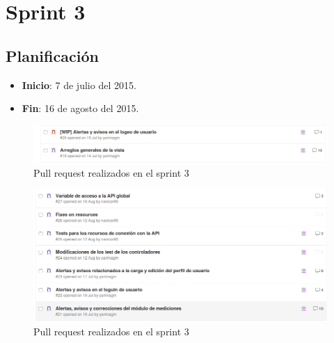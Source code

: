 \section{Sprint 3}%

\subsection{Planificación}
\begin{itemize}
    \item \textbf{Inicio}: 7 de julio del 2015.
    \item \textbf{Fin}: 16 de agosto del 2015.
\end{itemize}

\begin{figure}[h!]
  \centering
  \includegraphics[width=.8\textwidth]{img/3-PR_1_front}
  \caption{Pull request realizados en el sprint  3}
  \label{pull_request_sprint_3}
\end{figure}
\begin{figure}[h!]
  \centering
  \includegraphics[width=.8\textwidth]{img/3-PR_2_front}
  \caption{Pull request realizados en el sprint  3}
  \label{3-PR_back}
\end{figure}

